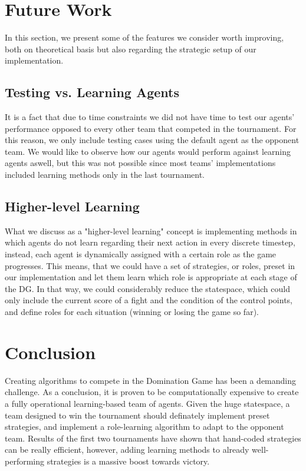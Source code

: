 \documentclass[conference]{IEEEtran}
\begin{document}
\section{Future Work}

In this section, we present some of the features we consider worth improving, both on theoretical basis but also regarding the strategic setup of our implementation.

\subsection{Testing vs. Learning Agents}
It is a fact that due to time constraints we did not have time to test our agents' performance opposed to every other team that competed in the tournament. For this reason, we only include testing cases using the default agent as the opponent team. We would like to observe how our agents would perform against learning agents aswell, but this was not possible since most teams' implementations included learning methods only in the last tournament.

\subsection{Higher-level Learning}
What we discuss as a "higher-level learning" concept is implementing methods in which agents do not learn regarding their next action in every discrete timestep, instead, each agent is dynamically assigned with a certain role as the game progresses. This means, that we could have a set of strategies, or roles, preset in our implementation and let them learn which role is appropriate at each stage of the DG. In that way, we could considerably reduce the statespace, which could only include the current score of a fight and the condition of the control points, and define roles for each situation (winning or losing the game so far).

\section{Conclusion}

Creating algorithms to compete in the Domination Game has been a demanding challenge. As a conclusion, it is proven to be computationally expensive to create a fully operational learning-based team of agents. Given the huge statespace, a team designed to win the tournament should definately implement preset strategies, and implement a role-learning algorithm to adapt to the opponent team. Results of the first two tournaments have shown that hand-coded strategies can be really efficient, however, adding learning methods to already well-performing strategies is a massive boost towards victory.
\end{document}
